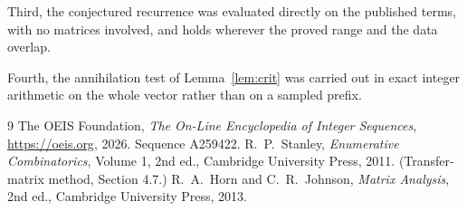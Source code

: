 \documentclass[11pt,a4paper]{article}
\theoremstyle{plain}
\theoremstyle{definition}
\begin{document}
Third, the conjectured recurrence was evaluated directly on the published terms, with no
matrices involved, and holds wherever the proved range and the data overlap.

Fourth, the annihilation test of Lemma~\ref{lem:crit} was carried out in exact integer
arithmetic on the whole vector rather than on a sampled prefix.

\begin{thebibliography}{9}
 The OEIS Foundation, \emph{The On-Line Encyclopedia of Integer
Sequences}, \url{https://oeis.org}, 2026. Sequence A259422.
 R.~P.~Stanley, \emph{Enumerative Combinatorics}, Volume 1, 2nd ed.,
Cambridge University Press, 2011. (Transfer-matrix method, Section 4.7.)
 R.~A.~Horn and C.~R.~Johnson, \emph{Matrix Analysis}, 2nd ed., Cambridge
University Press, 2013.
\end{thebibliography}
\end{document}
